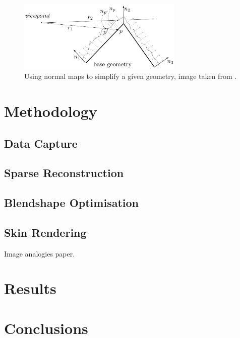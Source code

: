 \documentclass[11pt]{report}
\begin{document}
\begin{figure}[htbp!]
\centering
\includegraphics[width=0.7\textwidth]{img/normal_map}
	\caption{ Using normal maps to simplify a given geometry, image taken from \cite{ganovelli2014}.}
	\label{fig:normal_map}
\end{figure}



\chapter{Methodology}
\label{sec:methods}


\section{Data Capture}


\section{Sparse Reconstruction}


\section{Blendshape Optimisation}


\section{Skin Rendering}

\cite{Hertzmann2001} Image analogies paper.


\chapter{Results}


\chapter{Conclusions}



\end{document}

